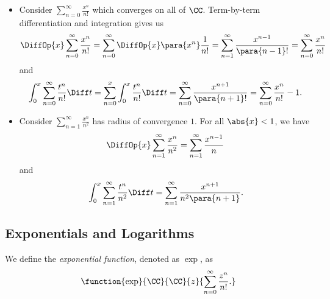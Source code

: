 \begin{examples}
    \label{ex:differentiating-integrating-power-series}%
    \begin{itemize}
        \item Consider \(\sum_{n = 0}^{\infty} \frac{x^n}{n!}\) which converges on all of \(\CC\). Term-by-term differentiation and integration gives us
        \[
            \DiffOp{x} \sum_{n = 0}^{\infty} \frac{x^n}{n!} = \sum_{n = 0}^{\infty} \DiffOp{x} \para{x^n} \frac{1}{n!} = \sum_{n = 1}^{\infty} \frac{x^{n - 1}}{\para{n - 1}!} = \sum_{n = 0}^{\infty} \frac{x^n}{n!}
        \]
        and
        \[
            \int_{0}^{x} \sum_{n = 0}^{\infty} \frac{t^n}{n!} \Diff t = \sum_{n = 0}^{x} \int_{0}^{x} \frac{t^n}{n!} \Diff t = \sum_{n = 0}^{\infty} \frac{x^{n + 1}}{\para{n + 1}!} = \sum_{n = 0}^{\infty} \frac{x^n}{n!} - 1.
        \]
        \item Consider \(\sum_{n = 1}^{\infty} \frac{x^n}{n^2}\) has radius of convergence \(1\). For all \(\abs{x} < 1\), we have
        \[
            \DiffOp{x} \sum_{n = 1}^{\infty} \frac{x^n}{n^2} = \sum_{n = 1}^{\infty} \frac{x^{n - 1}}{n}
        \]
        and
        \[
            \int_{0}^{x} \sum_{n = 1}^{\infty} \frac{t^n}{n^2} \Diff t = \sum_{n = 1}^{\infty} \frac{x^{n + 1}}{n^2 \para{n + 1}}.
        \]
    \end{itemize}
\end{examples}

\subsection{Exponentials and Logarithms}

\begin{definition}
    \label{def:exponential-function}%
    We define the \emph{exponential function}, denoted as \(\exp\), as
    \[
        \function{\exp}{\CC}{\CC}{z}{\sum_{n = 0}^{\infty} \frac{z^n}{n!}.}
    \]
\end{definition}


